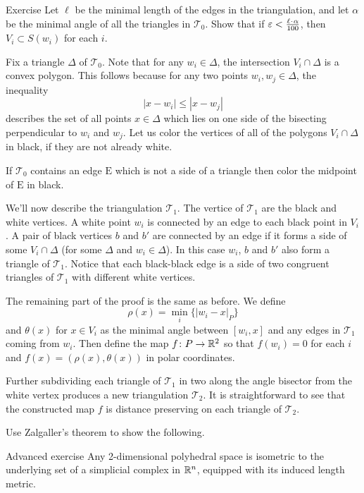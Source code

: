\begin{thm}{Exercise}\label{ex:voronoi-in-star}
Let $\ell$ be the minimal length of the edges in the triangulation,
and let $\alpha$ be the minimal angle of all the triangles in $\mathcal{T}_0$.
Show that if $\eps<\tfrac{\ell\cdot \alpha}{100}$, 
then $V_i\subset S(w_i)$ for each $i$.
\end{thm}



Fix a triangle $\Delta$ of $\mathcal{T}_0$.
Note that for any $w_i\in \Delta$, the intersection $V_i\cap \Delta$ is a convex polygon.
This follows because for any two points $w_i,w_j\in\Delta$,
the inequality 
$$|x-w_i|\le |x-w_j|$$ 
describes the set of all points $x \in \Delta$
which lies on one side of the bisecting perpendicular to $w_i$ and $w_j$.
Let us color the vertices of all of the polygons $V_i\cap \Delta$ in black, if they are not already white.

If $\mathcal{T}_0$ contains an edge $\mathrm{E}$ which is not 
a side of a triangle then color the midpoint of $\mathrm{E}$ in black.  

We'll now describe the triangulation $\mathcal{T}_1$.  The vertice of $\mathcal{T}_1$ are the black and white vertices.
A white point $w_i$ is connected by an edge to each black point in $V_i$.
A pair of black vertices $b$ and $b'$ are connected by an edge if it forms a side of some $V_i\cap \Delta$ 
(for some $\Delta$ and $w_i\in\Delta$).
In this case $w_i$, $b$ and $b'$ also form a triangle of $\mathcal{T}_1$.  Notice that each black-black edge is a side of two congruent triangles of $\mathcal{T}_1$ with different white vertices.

The remaining part of the proof is the same  as before.
We define $$\rho(x)=\min_i\{|w_i-x|_P\}$$
and $\theta(x)$ for $x\in V_i$ as the minimal angle between $[w_i,x]$ and any edges
in $\mathcal{T}_1$ coming from $w_i$.
Then define the map $f\colon P\to \mathbb{R}^2$ so that 
$f(w_i)=0$ for each $i$ 
and
$f(x)=(\rho(x),\theta(x))$ in polar coordinates.

Further subdividing each triangle of $\mathcal{T}_1$
in two along the angle bisector from the white vertex produces a new triangulation $\mathcal{T}_2$.
It is straightforward to see that the constructed map $f$ is distance preserving on each triangle of $\mathcal{T}_2$.
\qeds

Use Zalgaller's theorem to show the following.

\begin{thm}{Advanced exercise}\label{ex:zalgalle+embedding}
Any 2-dimensional polyhedral space is isometric to the underlying set of a simplicial complex in $\mathbb{R}^n$, equipped with its induced length metric. 
\end{thm}


